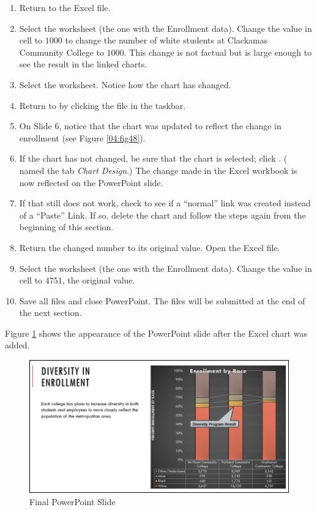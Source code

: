 \begin{enumbox}
	\begin{enumerate}
		\item Return to the  Excel file.
		\item Select the  worksheet (the one with the Enrollment data). Change the value in cell  to $ 1000 $ to change the number of white students at Clackamas Community College to $ 1000 $. This change is not factual but is large enough to see the result in the linked charts.
		\item Select the  worksheet. Notice how the chart has changed.
		\item Return to  by clicking the file in the taskbar.
		\item On Slide $ 6 $, notice that the chart was updated to reflect the change in enrollment (see Figure \ref{04:fig48}).
		\item If the chart has not changed, be sure that the chart is selected; click . ( named the tab \textit{Chart Design}.) The change made in the Excel workbook is now reflected on the PowerPoint slide.
		\item If that still does not work, check to see if a ``normal'' link was created instead of a ``Paste'' Link. If so, delete the chart and follow the steps again from the beginning of this section.
		\item Return the changed number to its original value. Open the   Excel file.
		\item Select the  worksheet (the one with the Enrollment data). Change the value in cell  to $ 4751 $, the original value.
		\item Save all files and close PowerPoint. The files will be submitted at the end of the next section.
	\end{enumerate}
\end{enumbox}

Figure \ref{04:fig51} shows the appearance of the PowerPoint slide after the Excel chart was added. 

\begin{figure}[H]
	\centering
	\includegraphics[width=\maxwidth{.95\linewidth}]{gfx/ch04_fig51}
	\caption{Final PowerPoint Slide}
	\label{04:fig51}
\end{figure}

